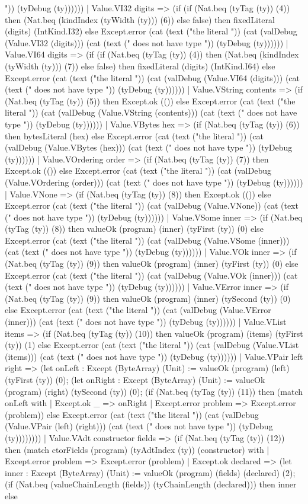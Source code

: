 \documentclass[11pt]{article}
\begin{document}
")) (tyDebug (ty)))))) | Value.VI32 digits => (if (if (Nat.beq (tyTag (ty)) (4)) then (Nat.beq (kindIndex (tyWidth (ty))) (6)) else false) then fixedLiteral (digits) (IntKind.I32) else Except.error (cat (text ("the literal ")) (cat (valDebug (Value.VI32 (digits))) (cat (text (" does not have type ")) (tyDebug (ty)))))) | Value.VI64 digits => (if (if (Nat.beq (tyTag (ty)) (4)) then (Nat.beq (kindIndex (tyWidth (ty))) (7)) else false) then fixedLiteral (digits) (IntKind.I64) else Except.error (cat (text ("the literal ")) (cat (valDebug (Value.VI64 (digits))) (cat (text (" does not have type ")) (tyDebug (ty)))))) | Value.VString contents => (if (Nat.beq (tyTag (ty)) (5)) then Except.ok (()) else Except.error (cat (text ("the literal ")) (cat (valDebug (Value.VString (contents))) (cat (text (" does not have type ")) (tyDebug (ty)))))) | Value.VBytes hex => (if (Nat.beq (tyTag (ty)) (6)) then bytesLiteral (hex) else Except.error (cat (text ("the literal ")) (cat (valDebug (Value.VBytes (hex))) (cat (text (" does not have type ")) (tyDebug (ty)))))) | Value.VOrdering order => (if (Nat.beq (tyTag (ty)) (7)) then Except.ok (()) else Except.error (cat (text ("the literal ")) (cat (valDebug (Value.VOrdering (order))) (cat (text (" does not have type ")) (tyDebug (ty)))))) | Value.VNone => (if (Nat.beq (tyTag (ty)) (8)) then Except.ok (()) else Except.error (cat (text ("the literal ")) (cat (valDebug (Value.VNone)) (cat (text (" does not have type ")) (tyDebug (ty)))))) | Value.VSome inner => (if (Nat.beq (tyTag (ty)) (8)) then valueOk (program) (inner) (tyFirst (ty)) (0) else Except.error (cat (text ("the literal ")) (cat (valDebug (Value.VSome (inner))) (cat (text (" does not have type ")) (tyDebug (ty)))))) | Value.VOk inner => (if (Nat.beq (tyTag (ty)) (9)) then valueOk (program) (inner) (tyFirst (ty)) (0) else Except.error (cat (text ("the literal ")) (cat (valDebug (Value.VOk (inner))) (cat (text (" does not have type ")) (tyDebug (ty)))))) | Value.VError inner => (if (Nat.beq (tyTag (ty)) (9)) then valueOk (program) (inner) (tySecond (ty)) (0) else Except.error (cat (text ("the literal ")) (cat (valDebug (Value.VError (inner))) (cat (text (" does not have type ")) (tyDebug (ty)))))) | Value.VList items => (if (Nat.beq (tyTag (ty)) (10)) then valueOk (program) (items) (tyFirst (ty)) (1) else Except.error (cat (text ("the literal ")) (cat (valDebug (Value.VList (items))) (cat (text (" does not have type ")) (tyDebug (ty)))))) | Value.VPair left right => (let onLeft : Except (ByteArray) (Unit) := valueOk (program) (left) (tyFirst (ty)) (0); (let onRight : Except (ByteArray) (Unit) := valueOk (program) (right) (tySecond (ty)) (0); (if (Nat.beq (tyTag (ty)) (11)) then (match onLeft with | Except.ok \_ => onRight | Except.error problem => Except.error (problem)) else Except.error (cat (text ("the literal ")) (cat (valDebug (Value.VPair (left) (right))) (cat (text (" does not have type ")) (tyDebug (ty)))))))) | Value.VAdt constructor fields => (if (Nat.beq (tyTag (ty)) (12)) then (match ctorFields (program) (tyAdtIndex (ty)) (constructor) with | Except.error problem => Except.error (problem) | Except.ok declared => (let inner : Except (ByteArray) (Unit) := valueOk (program) (fields) (declared) (2); (if (Nat.beq (valueChainLength (fields)) (tyChainLength (declared))) then inner else 
\end{document}
